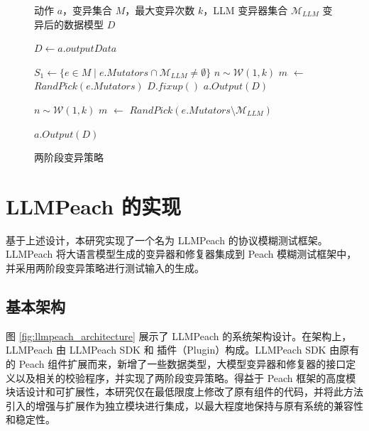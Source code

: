 \begin{figure}[H]
\begin{minipage}{\textwidth}
\begin{algorithm}[H]
\caption{两阶段变异策略}
\begin{algorithmic}[1]
\fontsize{10pt}{8pt}\selectfont
\Require 动作 $a$，变异集合 $M$，最大变异次数 $k$，LLM 变异器集合 $\mathcal{M}_{LLM}$
\Ensure 变异后的数据模型 $D$

\State $D \gets a.outputData$

\State $S_1 \gets \{ e \in M \mid e.Mutators \cap \mathcal{M}_{LLM} \neq \emptyset \}$ 
 
    \State $n \sim \mathcal{W}(1,k)$
        \State $m$ $\gets$ $RandPick(e.Mutators)$ 
    \EndFor
\EndFor
\State $D.fixup()$ 
\State $a.Output(D)$ 

 
    \State $n \sim \mathcal{W}(1,k)$
        \State $m$ $\gets$ $RandPick(e.Mutators \setminus \mathcal{M}_{LLM})$ 
    \EndFor
\EndFor

\State $a.Output(D)$ 

\end{algorithmic}
\end{algorithm}
\end{minipage}

\label{fig:two_phase_algorithm}
\end{figure}

\section{LLMPeach 的实现}

基于上述设计，本研究实现了一个名为 LLMPeach 的协议模糊测试框架。LLMPeach 将大语言模型生成的变异器和修复器集成到 Peach 模糊测试框架中，并采用两阶段变异策略进行测试输入的生成。

\subsection{基本架构}

图 \ref{fig:llmpeach_architecture} 展示了 LLMPeach 的系统架构设计。在架构上，LLMPeach 由 LLMPeach SDK 和 插件（Plugin）构成。LLMPeach SDK 由原有的 Peach 组件扩展而来，新增了一些数据类型，大模型变异器和修复器的接口定义以及相关的校验程序，并实现了两阶段变异策略。得益于 Peach 框架的高度模块话设计和可扩展性，本研究仅在最低限度上修改了原有组件的代码，并将此方法引入的增强与扩展作为独立模块进行集成，以最大程度地保持与原有系统的兼容性和稳定性。

